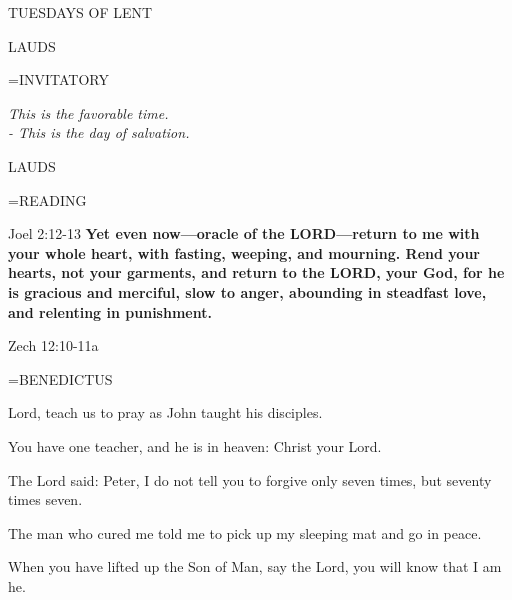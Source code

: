 \begin{center}\normalsize TUESDAYS OF LENT\\
\end{center}

\begin{flushleft}\normalsize LAUDS\\\end{flushleft}

\hangindent=\parindent \small{INVITATORY}
\begin{center}
\textit{This is the favorable time.\\}
\textit{- This is the day of salvation.\\}
\end{center}

\begin{flushleft}\normalsize LAUDS\\\end{flushleft}

\hangindent=\parindent \small READING
\begin{description}[labelindent=\parindent, leftmargin=*]
\item [Weeks 1-4:]     Joel 2:12-13 \textbf{    Yet even now—oracle of the LORD—return to me with your whole heart, with fasting, weeping, and mourning. Rend your hearts, not your garments, and return to the LORD, your God, for he is gracious and merciful, slow to anger, abounding in steadfast love, and relenting in punishment.\\}
\item [Week 5:]     Zech 12:10-11a \textbf{    \\}
\end{description}

\hangindent=\parindent \small BENEDICTUS
\begin{description}[labelindent=\parindent, leftmargin=*]
\item [Week 1:] 	Lord, teach us to pray as John taught his disciples.
\item [Week 2:] 	You have one teacher, and he is in heaven: Christ your Lord.
\item [Week 3:] 	The Lord said: Peter, I do not tell you to forgive only seven times, but seventy times seven.
\item [Week 4:] 	The man who cured me told me to pick up my sleeping mat and go in peace.
\item [Week 5:] 	When you have lifted up the Son of Man, say the Lord, you will know that I am he.
\end{description}

